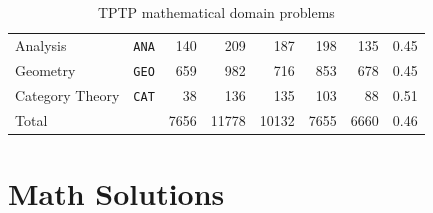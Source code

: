 \documentclass[runningheads]{llncs}
\begin{document}
\begin{table}[htb]
\begin{center}
\begin{tabular}{lr|rr|rrrr}
Analysis            & {\tt ANA} &  140 &  209 &  187 &  198 &  135 & 0.45 \\
Geometry            & {\tt GEO} &  659 &  982 &  716 &  853 &  678 & 0.45 \\
Category Theory     & {\tt CAT} &   38 &  136 &  135 &  103 &   88 & 0.51 \\
\hline
Total               &           & 7656 &11778 &10132 & 7655 & 6660 & 0.46 \\
\end{tabular}
\end{center}
\caption{TPTP mathematical domain problems}
\label{Domains}
\end{table}

\section{Math Solutions}
\label{MathSolutions}
\end{document}
